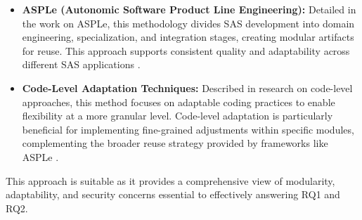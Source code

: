 \documentclass[a4paper,10pt]{article}
\begin{document}
\begin{itemize}
    \item \textbf{ASPLe (Autonomic Software Product Line Engineering):} Detailed in the work on ASPLe, this methodology divides SAS development into domain engineering, specialization, and integration stages, creating modular artifacts for reuse. This approach supports consistent quality and adaptability across different SAS applications \cite{Nadeem2020}.
    
    
    \item \textbf{Code-Level Adaptation Techniques:} Described in research on code-level approaches, this method focuses on adaptable coding practices to enable flexibility at a more granular level. Code-level adaptation is particularly beneficial for implementing fine-grained adjustments within specific modules, complementing the broader reuse strategy provided by frameworks like ASPLe \cite{Korra2022}.
\end{itemize}

This approach is suitable as it provides a comprehensive view of modularity, adaptability, and security concerns essential to effectively answering RQ1 and RQ2.





\end{document}
